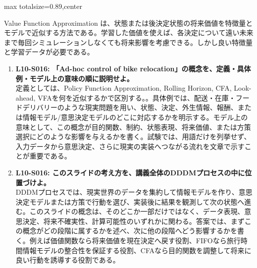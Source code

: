 \begin{minipage}[t]{0.58\textwidth}
\begin{adjustbox}{max totalsize={\textwidth}{0.89\textheight},center}
\begin{minipage}{\textwidth}
Value Function Approximation は、状態または後決定状態の将来価値を特徴量とモデルで近似する方法である。学習した価値を使えば、各決定について遠い未来まで毎回シミュレーションしなくても将来影響を考慮できる。しかし良い特徴量と学習データが必要である。\par{}\begin{enumerate}\item \textbf{L10-S016: 「Ad-hoc control of bike relocation」の概念を、定義・具体例・モデル上の意味の順に説明せよ。}\\定義としては、Policy Function Approximation, Rolling Horizon, CFA, Look-ahead, VFAを何を近似するかで区別する。。具体例では、配送・在庫・フードデリバリーのような現実問題を用い、状態、決定、外生情報、報酬、または情報モデル/意思決定モデルのどこに対応するかを明示する。モデル上の意味として、この概念が目的関数、制約、状態表現、将来価値、または方策選択にどのような影響を与えるかを書く。試験では、用語だけを列挙せず、入力データから意思決定、さらに現実の実装へつながる流れを文章で示すことが重要である。\item \textbf{L10-S016: このスライドの考え方を、講義全体のDDDMプロセスの中に位置づけよ。}\\DDDMプロセスでは、現実世界のデータを集約して情報モデルを作り、意思決定モデルまたは方策で行動を選び、実装後に結果を観測して次の状態へ進む。このスライドの概念は、そのどこか一部だけではなく、データ表現、意思決定、将来不確実性、計算可能性のいずれかに関わる。答案では、まずこの概念がどの段階に属するかを述べ、次に他の段階へどう影響するかを書く。例えば価値関数なら将来価値を現在決定へ戻す役割、FIFOなら旅行時間情報モデルの整合性を保証する役割、CFAなら目的関数を調整して将来に良い行動を誘導する役割である。\end{enumerate}
\end{minipage}
\end{adjustbox}
\end{minipage}


